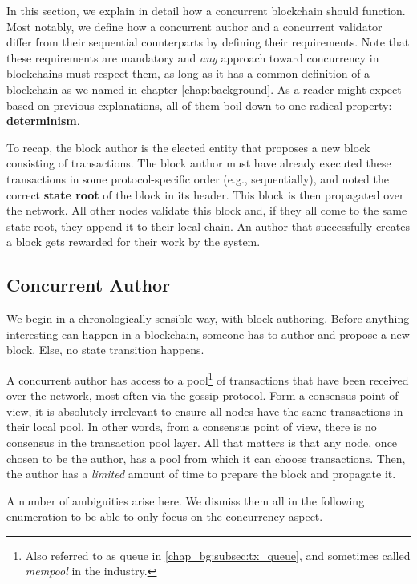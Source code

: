 In this section, we explain in detail how a concurrent blockchain should function. Most notably, we
define how a concurrent author and a concurrent validator differ from their sequential counterparts
by defining their requirements. Note that these requirements are mandatory and \textit{any} approach
toward concurrency in blockchains must respect them, as long as it has a common definition of a
blockchain as we named in chapter \ref{chap:background}. As a reader might expect based on previous
explanations, all of them boil down to one radical property: \textbf{determinism}.

To recap, the block author is the elected entity that proposes a new block consisting of
transactions. The block author must have already executed these transactions in some
protocol-specific order (e.g., sequentially), and noted the correct \textbf{state root} of the block
in its header. This block is then propagated over the network. All other nodes validate this block
and, if they all come to the same state root, they append it to their local chain. An author that
successfully creates a block gets rewarded for their work by the system.

\subsection{Concurrent Author} \label{chap_appraoch:subsec:concurrent_author}

We begin in a chronologically sensible way, with block authoring. Before anything interesting can
happen in a blockchain, someone has to author and propose a new block. Else, no state transition
happens.

A concurrent author has access to a pool\footnote{Also referred to as queue in
\ref{chap_bg:subsec:tx_queue}, and sometimes called \textit{mempool} in the industry.} of
transactions that have been received over the network, most often via the gossip protocol. Form a
consensus point of view, it is absolutely irrelevant to ensure all nodes have the same transactions
in their local pool. In other words, from a consensus point of view, there is no consensus in the
transaction pool layer. All that matters is that any node, once chosen to be the author, has a pool
from which it can choose transactions. Then, the author has a \textit{limited} amount of time to
prepare the block and propagate it.

A number of ambiguities arise here. We dismiss them all in the following enumeration to be able to
only focus on the concurrency aspect.

